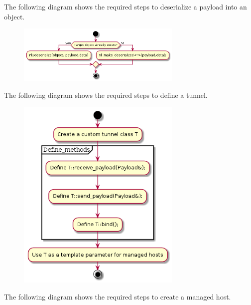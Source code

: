 \documentclass[12pt]{report}
\begin{document}
                \newpage
                The following diagram shows the required steps to deserialize a payload into an object.

                \begin{figure}[H]
                \centering
                \includegraphics[width=0.7\textwidth]{d/ac/def_deserialize_obj.png}
                \end{figure}





                \newpage
                The following diagram shows the required steps to define a tunnel.

                \begin{figure}[H]
                \centering
                \includegraphics[width=0.7\textwidth]{d/ac/def_tunnel.png}
                \end{figure}






                \newpage
                The following diagram shows the required steps to create a managed host.
\end{document}
